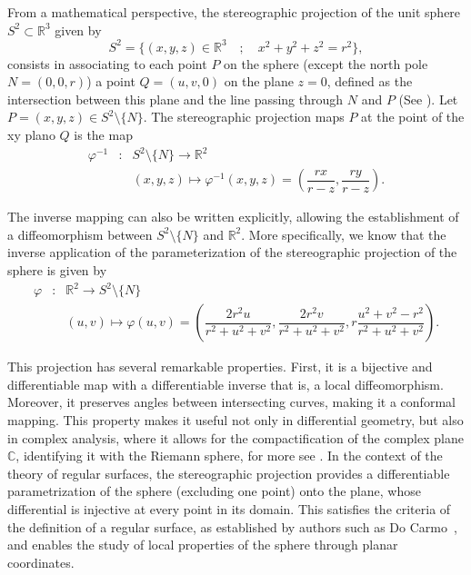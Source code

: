 \documentclass{amsart}
\theoremstyle{plain}
\numberwithin{equation}{section}
\begin{document}
	
	From a mathematical perspective, the stereographic projection of the unit sphere $S^2 \subset \mathbb{R}^3$ given by
	$$
	S^2 = \{ (x,y,z) \in \mathbb{R}^3 \quad ; \quad x^2 + y^2 + z^2 = r^2 \}, 
	$$
	consists in associating to each point $ P $ on the sphere (except the north pole $ N = (0, 0, r) $) a point $ Q = (u,v,0) $ on the plane $ z = 0 $, defined as the intersection between this plane and the line passing through $ N $ and $P$ (See \cite{docarmo}). Let $ P = (x, y, z) \in S^2 \setminus \{N\} $. The stereographic projection maps $ P $ at the point of the xy plano $Q$ is the map
	\begin{equation}
		\begin{array}{rcl}
			\varphi^{-1} & : & S^2 \setminus \{N \} \longrightarrow  \mathbb{R}^2 \\
			&  & (x,y,z) \longmapsto \varphi^{-1}(x,y,z) = \left( \dfrac{rx}{r-z}, \dfrac{ry}{r - z} \right).
		\end{array}
	\end{equation}
	
	The inverse mapping can also be written explicitly, allowing the establishment of a diffeomorphism between $ S^2 \setminus \{N\} $ and $\mathbb{R}^2 $. More specifically, we know that the inverse application of the parameterization of the stereographic projection of the sphere is given by
	\begin{equation}\label{parametriza esfera}
		\begin{array}{rcl}
			\varphi & : & \mathbb{R}^2 \longrightarrow S^2 \setminus \{N \} \\
			&  & (u,v) \longmapsto \varphi(u,v) = \left( \dfrac{2r^2 u}{r^2 + u^2 + v^2}, \dfrac{2r^2 v}{r^2 + u^2 + v^2}, r \dfrac{u^2 + v^2 - r^2}{r^2 + u^2 + v^2} \right).
		\end{array}
	\end{equation}
	
	This projection has several remarkable properties. First, it is a bijective and differentiable map with a differentiable inverse that is, a local diffeomorphism. Moreover, it preserves angles between intersecting curves, making it a conformal mapping. This property makes it useful not only in differential geometry, but also in complex analysis, where it allows for the compactification of the complex plane $\mathbb{C}$, identifying it with the Riemann sphere, for more see \cite{carroll}. In the context of the theory of regular surfaces, the stereographic projection provides a differentiable parametrization of the sphere (excluding one point) onto the plane, whose differential is injective at every point in its domain. This satisfies the criteria of the definition of a regular surface, as established by authors such as Do Carmo~\cite{docarmo}, and enables the study of local properties of the sphere through planar coordinates.
	
\end{document}
